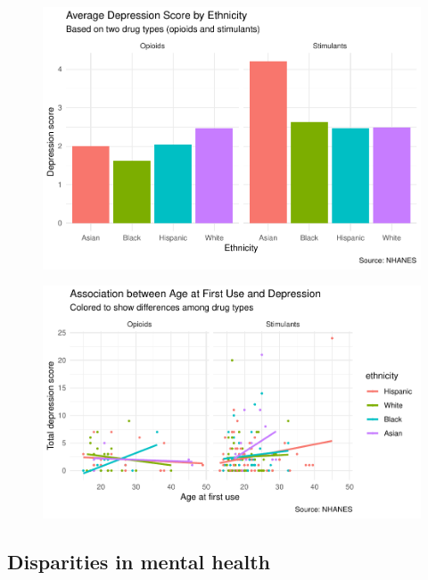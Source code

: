 \documentclass[man]{apa6}
\begin{document}
\begin{figure}
\centering
\includegraphics{Final_Paper_Group_3_files/figure-latex/ST_fig3-1.pdf}
\caption{}
\end{figure}

\begin{figure}
\centering
\includegraphics{Final_Paper_Group_3_files/figure-latex/ST_fig4-1.pdf}
\caption{}
\end{figure}

\subsection{Disparities in mental
health}\label{disparities-in-mental-health}
\end{document}
